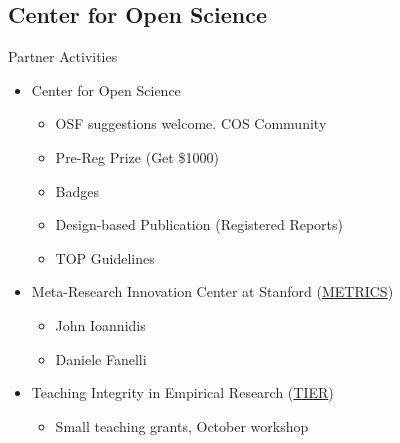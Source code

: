 \documentclass{beamer}
\begin{document}
\subsection{Center for Open Science}
\begin{frame}{Partner Activities}
\begin{itemize}
 \item Center for Open Science
	\begin{itemize}
 	\item OSF suggestions welcome. COS Community \href{http://centerforopenscience.org/involved_participate/}{}
 	\item Pre-Reg Prize (Get \$1000) \href{http://centerforopenscience.org/prereg/}{}
 	\item Badges
 	\item Design-based Publication (Registered Reports)
 	\item TOP Guidelines
 	\end{itemize}
\item Meta-Research Innovation Center at Stanford (\href{http://metrics.stanford.edu}{METRICS}) 
	\begin{itemize}
	\item John Ioannidis
	\item Daniele Fanelli
	\end{itemize}
\item Teaching Integrity in Empirical Research (\href{http://www.haverford.edu/TIER/}{TIER})
	\begin{itemize}
	\item Small teaching grants, October workshop \href{http://www.haverford.edu/TIER/fellowships_workshops/workshop_fall_2015.php}{}
	\end{itemize}
\end{itemize}
\end{frame}
\end{document}

